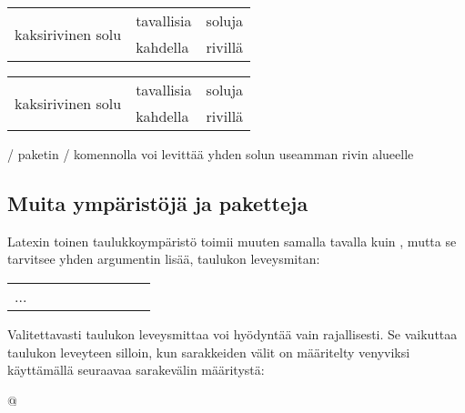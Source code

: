\begin{esimerkki*}
  \komentoi{\keno}

\begin{koodilohko}
\begin{tabular}{|l|l|l|}
  \hline
  \multirow{2}{*}{kaksirivinen solu} & tavallisia & soluja \\
  \cline{2-3}
                                     & kahdella   & rivillä \\
  \hline
\end{tabular}
\end{koodilohko}

  \begin{tulos}
    \renewcommand{\arraystretch}{1.3}
    \begin{tabular}{|l|l|l|}
      \hline
      \multirow{2}{*}[-1bp]{kaksirivinen solu} & tavallisia & soluja \\
      \cline{2-3}
                                               & kahdella & rivillä \\
      \hline
    \end{tabular}
  \end{tulos}

  \caption{\-/ paketin \-/
    komennolla voi levittää yhden solun useamman rivin alueelle}
  \label{esim:taulukko_multirow}
\end{esimerkki*}

\subsection{Muita ympäristöjä ja paketteja}

Latexin toinen taulukkoympäristö  toimii muuten
samalla tavalla kuin , mutta se tarvitsee yhden
argumentin lisää, taulukon leveysmitan:

\begin{koodilohkosis}
\begin{tabular*}{leveys}[sijainti]{sarakkeet}
  ...
\end{tabular*}
\end{koodilohkosis}

Valitettavasti taulukon leveysmittaa voi hyödyntää vain rajallisesti. Se
vaikuttaa taulukon leveyteen silloin, kun sarakkeiden välit on
määritelty venyviksi käyttämällä seuraavaa sarakevälin määritystä:

\begin{koodilohkosis}
@{\extracolsep{\fill}}
\end{koodilohkosis}

